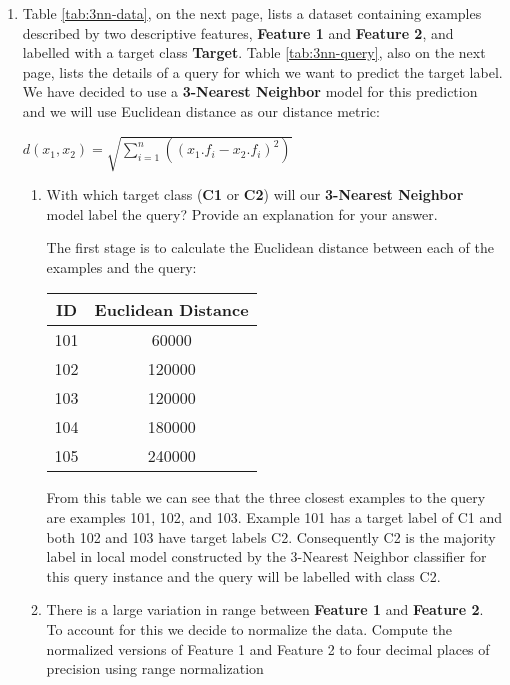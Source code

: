 \documentclass[--SOLUTION-OPTION--]{ditpaper}
\begin{document}
\clearpage

\question 
	\begin{enumerate}	
		\item Table \ref{tab:3nn-data}, on the next page, lists a dataset containing examples described by two descriptive features, \textbf{Feature 1} and \textbf{Feature 2}, and labelled with a target class \textbf{Target}. Table \ref{tab:3nn-query}, also on the next page, lists the details of a query for which we want to predict the target label. We have decided to use a \textbf{3-Nearest Neighbor} model for this prediction and we will use Euclidean distance as our distance metric: 
								\begin{center}
								$d(x_1,x_2)=\sqrt{\sum_{i=1}^{n} \left(\left(x_1.f_i - x_2.f_i \right)^2 \right)}$
								\end{center}					
		\begin{enumerate}
				\item With which target class (\textbf{C1}  or \textbf{C2}) will our \textbf{3-Nearest Neighbor} model label the query? Provide an explanation for your answer.				
				\begin{answer}
					The first stage is to calculate the Euclidean distance between each of the examples and the query:
					\begin{center}
						\begin{tabular}{|c|c|}
						ID & Euclidean Distance \\
						\hline
						101 & 60000\\
						102 & 120000\\
						103 & 120000\\
						104 & 180000\\
						105 & 240000\\
						\hline
						\end{tabular}
					\end{center}
				 From this table we can see that the three closest examples to the query are examples 101, 102, and 103. Example 101 has a target label of C1 and both 102 and 103 have target labels C2. Consequently C2 is the majority label in local model constructed by the 3-Nearest Neighbor classifier for this query instance and the query will be labelled with class C2.
				\end{answer}
			\item There is a large variation in range between \textbf{Feature 1} and \textbf{Feature 2}. To account for this we decide to normalize the data. Compute the normalized versions of Feature 1 and Feature 2  to four decimal places of precision using range normalization 

\end{enumerate}
\end{enumerate}
\end{document}
